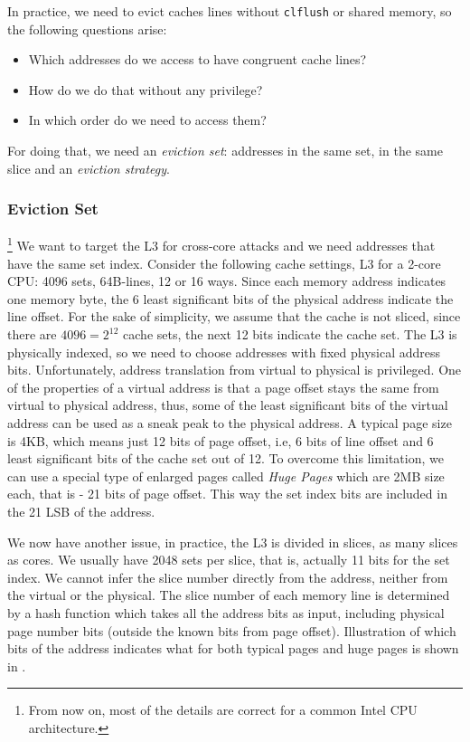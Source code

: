 In practice, we need to evict caches lines without \texttt{clflush} or shared memory, so the following questions arise:
\begin{itemize}
    \item Which addresses do we access to have congruent cache lines?
    \item How do we do that without any privilege?
    \item In which order do we need to access them?
\end{itemize}
For doing that, we need an \textit{eviction set}: addresses in the same set, in the same slice and an \textit{eviction strategy}.

\subsubsection{Eviction Set}
\label{subsubsec:evictionset}
\footnote{From now on, most of the details are correct for a common Intel CPU architecture.}
We want to target the L3 for cross-core attacks and we need addresses that have the same set index. Consider the following cache settings, L3 for a 2-core CPU: 4096 sets, 64B-lines, 12 or 16 ways. Since each memory address indicates one memory byte, the 6 least significant bits of the physical address indicate the line offset. For the sake of simplicity, we assume that the cache is not sliced, since there are $4096=2^{12}$ cache sets, the next 12 bits indicate the cache set. The L3 is physically indexed, so we need to choose addresses with fixed physical address bits. Unfortunately, address translation from virtual to physical is privileged. One of the properties of a virtual address is that a page offset stays the same from virtual to physical address, thus, some of the least significant bits of the virtual address can be used as a sneak peak to the physical address. A typical page size is 4KB, which means just 12 bits of page offset, i.e, 6 bits of line offset and 6 least significant bits of the cache set out of 12. To overcome this limitation, we can use a special type of enlarged pages called \textit{Huge Pages} which are 2MB size each, that is - 21 bits of page offset. This way the set index bits are included in the 21 LSB of the address.

We now have another issue, in practice, the L3 is divided in slices, as many slices as cores. We usually have 2048 sets per slice, that is, actually 11 bits for the set index. We cannot infer the slice number directly from the address, neither from the virtual or the physical. The slice number of each memory line is determined by a hash function which takes all the address bits as input, including physical page number bits (outside the known bits from page offset). Illustration of which bits of the address indicates what for both typical pages and huge pages is shown in .

